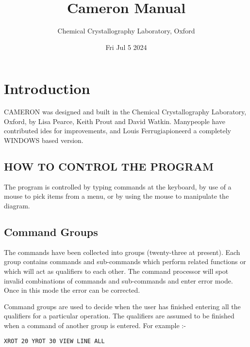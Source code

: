 \documentclass[10pt,a4paper]{report}
\begin{document}
\lhead{\slshape \rightmark}
\chead{}
\rhead{\thepage}
\cfoot{}
\rfoot{}
\renewcommand{\headrulewidth}{0pt}
\renewcommand{\footrulewidth}{0pt}
\fancypagestyle{plain}{%
\fancyhf{}
\fancyfoot[L]{Fri Jul  5  2024}
\fancyfoot[C]{\thepage}
\renewcommand{\headrulewidth}{0pt}
\renewcommand{\footrulewidth}{0pt}}
\newcommand{\Instruction}[1]{{\bf #1}}
\newcommand{\Directive}[1]{{\bf \emph{#1}}}
\newcommand{\Keyword}[1]{\emph{#1}}
\sloppy
\title{Cameron Manual}
\author{Chemical Crystallography Laboratory, Oxford}
\date{Fri Jul  5  2024}
\maketitle
\tableofcontents
\chapter{Introduction}


CAMERON was designed and built in the Chemical Crystallography Laboratory, Oxford, by Lisa Pearce, Keith Prout and David Watkin. Manypeople have contributed ides for improvements, and Louis Ferrugiapioneerd a completely WINDOWS based version.\section{HOW TO CONTROL THE PROGRAM}


The program is controlled by typing commands at the keyboard,
by use of a mouse to pick items from a menu, or by using the mouse
to manipulate the diagram.
\section{Command Groups}


The commands have been collected into groups (twenty-three at present).
Each group contains commands and sub-commands which perform related
functions or which will act as qualifiers to each other. The command
processor will spot invalid combinations of commands and sub-commands
and enter error mode. Once in this mode the error can be corrected.


Command groups are used to decide when the user has finished entering
all the qualifiers for a particular operation. The qualifiers are
assumed to be finished when a command of another group is entered.
For example :-
\small\begin{verbatim}
XROT 20 YROT 30 VIEW LINE ALL
\end{verbatim}\normalsize
\end{document}
